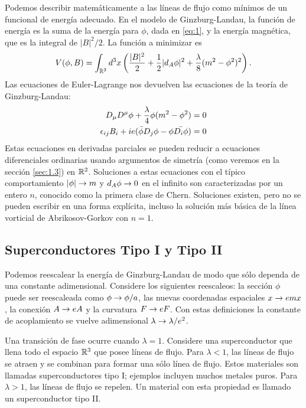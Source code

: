 Podemos describir matemáticamente a las líneas de flujo como mínimos de un funcional de energía adecuado. En el modelo de Ginzburg-Landau, la función de energía es la suma de la energía para $\phi$, dada en \eqref{eq:1}, y la energía magnética, que es la integral de $|B|^2/2$. La función a minimizar es
\begin{align}
	V(\phi,B) = \int_{\mathbb{R}^3}d^3x\left(\frac{|B|^2}{2}+\frac{1}{2}|d_A\phi|^2+\frac{\lambda}{8}(m^2-\phi^2)^2\right).
\end{align}
Las ecuaciones de Euler-Lagrange nos devuelven las ecuaciones de la teoría de Ginzburg-Landau:
\begin{align}
	D_\mu D^\mu\phi+\frac{\lambda}{4}\phi(m^2-\phi^2) &=0\\
	\epsilon_{ij}B_i+ie(\bar\phi D_j\phi-\phi\bar{D_i\phi}) &=0
\end{align}
Estas ecuaciones en derivadas parciales se pueden reducir a ecuaciones diferenciales ordinarias usando argumentos de simetría (como veremos en la sección \ref{sec:1.3}) en $\mathbb{R}^2$. Soluciones a estas ecuaciones con el típico comportamiento $|\phi|\rightarrow m$ y $d_A\phi\rightarrow 0$ en el infinito son caracterizadas por un entero $n$, conocido como la primera clase de Chern. Soluciones existen, pero no se pueden escribir en una forma explícita, incluso la solución más básica de la línea vorticial de Abrikosov-Gorkov con $n=1$.

\subsection{Superconductores Tipo I y Tipo II}

Podemos reescalear la energía de Ginzburg-Landau de modo que sólo dependa de una constante adimensional. Considere los siguientes reescaleos: la sección $\phi$ puede ser reescaleada como $\phi\rightarrow\phi/a$, las nuevas coordenadas espaciales $x\rightarrow emx$, la conexión $A\rightarrow eA$ y la curvatura $F\rightarrow eF$. Con estas definiciones la constante de acoplamiento se vuelve adimensional $\lambda\rightarrow\lambda/e^2$.

Una transición de fase ocurre cuando $\lambda=1$. Considere una superconductor que llena todo el espacio $\mathbb{R}^3$ que posee líneas de flujo. Para $\lambda<1$, las líneas de flujo se atraen y se combinan para formar una sólo línea de flujo. Estos materiales son llamadas superconductores tipo I; ejemplos incluyen muchos metales puros. Para $\lambda>1$, las líneas de flujo se repelen. Un material con esta propiedad es llamado un superconductor tipo II.

